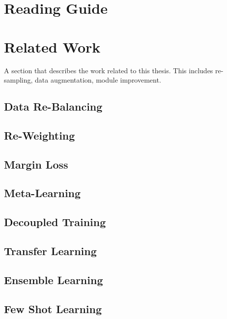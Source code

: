 

\section{Reading Guide}

\section{Related Work}
A section that describes the work related to this thesis. This includes re-sampling, data augmentation, module improvement.

\subsection{Data Re-Balancing}

\subsection{Re-Weighting}

\subsection{Margin Loss}

\subsection{Meta-Learning}

\subsection{Decoupled Training}

\subsection{Transfer Learning}

\subsection{Ensemble Learning}

\subsection{Few Shot Learning}


